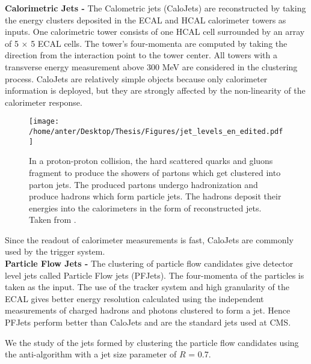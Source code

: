 {\bf Calorimetric Jets -} The Calometric jets (CaloJets) are reconstructed by taking the energy clusters deposited in the ECAL and HCAL calorimeter towers as inputs. One calorimetric tower consists of one HCAL cell surrounded by an array of 5 $\times$ 5 ECAL cells. The tower’s four-momenta are computed by taking the direction from the interaction point to the tower center. All towers with a transverse energy measurement above 300 MeV are considered in the clustering process. CaloJets are relatively simple objects because only calorimeter information is deployed, but they are strongly affected by the non-linearity of the calorimeter response. \begin{figure}[!h]
\begin{center}
\vspace*{3mm} 
\hspace*{-5mm}
\texttt{[image: /home/anter/Desktop/Thesis/Figures/jet\_levels\_en\_edited.pdf]}\\
\vspace*{4mm}
\caption[Formation of jets in a proton-proton collision at different levels.]{In a proton-proton collision, the hard scattered quarks and gluons fragment to produce the showers of partons which get clustered into parton jets. The produced partons undergo hadronization and produce hadrons which form particle jets. The hadrons deposit their energies into the calorimeters in the form of reconstructed jets. Taken from \cite{Schorner-Sadenius:2015cga}.}
\label{fig:jets}
\end{center}
\end{figure} Since the readout of calorimeter measurements is fast, CaloJets are commonly used by the trigger system. \\ \newline
{\bf Particle Flow Jets -} The clustering of particle flow candidates give detector level jets called Particle Flow jets (PFJets). The four-momenta of the particles is taken as the input. The use of the tracker system and high granularity of the ECAL gives better energy resolution calculated using the independent measurements of charged hadrons and photons clustered to form a jet. Hence PFJets perform better than CaloJets and are the standard jets used at CMS.

We the study of the jets formed by clustering the particle flow candidates using the anti-\kt algorithm with a jet size parameter of $R$ = 0.7. 

